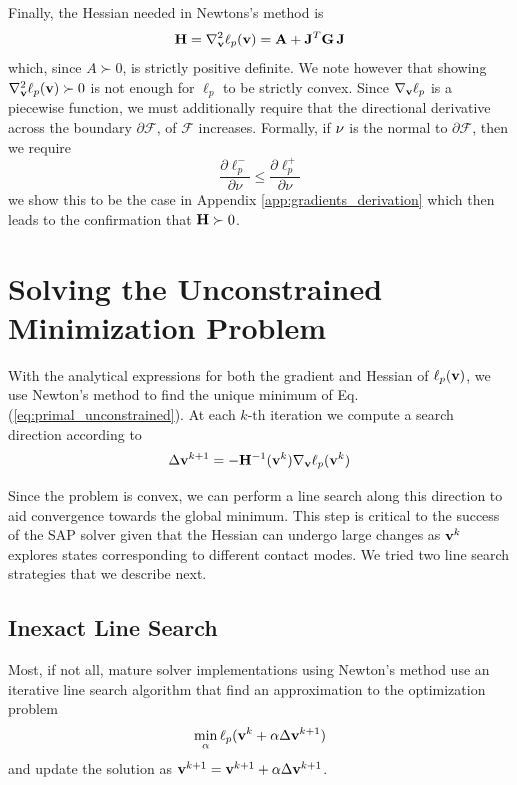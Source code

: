 Finally, the Hessian needed in Newtons's method is
\begin{equation}
	\mf{H}= \nabla_\mf{v}^2\ell_p(\mf{v}) = \mf{A} + \mf{J}^T\mf{G}\,\mf{J}
	\label{eq:ell_hessian}
\end{equation}
which, since $A\succ 0$, is strictly positive definite. We note however that
showing $\nabla_{\mathbf{v}}^2\ell_p({\mathbf{v}})\succ 0$ is not enough for $\ell_p$ to be
strictly convex. Since $\nabla_{\mathbf{v}}\ell_p$ is a piecewise function, we must
additionally require that the directional derivative across the boundary
$\partial\mathcal{F}$, of $\mathcal{F}$ increases. Formally, if ${\mathbf{\nu}}$ is
the normal to $\partial\mathcal{F}$, then we require
\begin{equation}
	\frac{\partial \ell_p^-}{\partial \nu} \le \frac{\partial \ell_p^+}{\partial \nu}
\end{equation}
we show this to be the case in Appendix \ref{app:gradients_derivation} which
then leads to the confirmation that ${\mathbf{H}}\succ 0$.


\section{Solving the Unconstrained Minimization Problem}
\label{sec:solver_details}

With the analytical expressions for both the gradient and Hessian of
$\ell_p({\mathbf{v}})$, we use Newton's method to find the unique minimum of Eq.
(\ref{eq:primal_unconstrained}). At each $k\text{-th}$ iteration we
compute a search direction according to
\begin{equation}
	\Delta\mf{v}^{k+1} = -\mf{H}^{-1}(\mf{v}^k)\nabla_\mf{v}\ell_p(\mf{v}^k)
	\label{eq:Newton_iteration}
\end{equation}

Since the problem is convex, we can perform a line search along this
direction to aid convergence towards the global minimum. This step is critical
to the success of the SAP solver given that the Hessian can undergo large
changes as ${\mathbf{v}}^k$ explores states corresponding to different contact
modes. We tried two line search strategies that we describe next.

\subsection{Inexact Line Search}
Most, if not all, mature solver implementations using Newton's method use an
iterative line search algorithm that find an approximation to the optimization
problem
\begin{eqnarray}
	\min_{\alpha} \ell_p({\mathbf{v}}^k + \alpha \Delta{\mathbf{v}}^{k+1})
\end{eqnarray}
and update the solution as ${\mathbf{v}}^{k+1}={\mathbf{v}}^{k+1} + \alpha
\Delta{\mathbf{v}}^{k+1}$.


